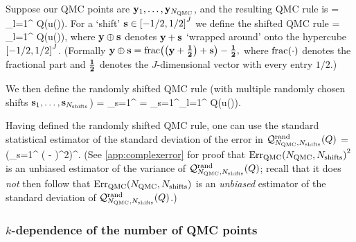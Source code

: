     Suppose our QMC points are $\mathbf{y}_{1},\ldots,\mathbf{y}_{N_{\mathrm{QMC}}}$, and the resulting QMC rule is
    \beqs
{} = \sum_{l=1}^{\NQMC} Q\mleft(u\mleft(\byl\mright)\mright).
\eeqs
For a `shift' $\shift \in \cube{J}$ we define the shifted QMC rule
\beqs
{} = \sum_{l=1}^{\NQMC} Q\mleft(u\mleft(\byl\oplus\shift\mright)\mright),
\eeqs
where $\mathbf{y} \oplus \mathbf{s}$ denotes $\mathbf{y} + \mathbf{s}$ `wrapped around' onto the hypercube $\cube{J}$. (Formally $\by \oplus \shift = \fracoperator{\mleft(\by + \bhalf\mright)+\shift} - \bhalf,$ where $\fracoperator{\cdot}$ denotes the fractional part and $\mathbf{\frac{1}{2}}$ denotes the $J$-dimensional vector with every entry $1/2.$)

We then define the randomly shifted QMC rule (with multiple randomly chosen shifts $\mathbf{s}_{1},\ldots,\mathbf{s}_{N_{\mathrm{shifts}}}$)
\beqs
{} = \sum_{s=1}^{\Nshifts}  = \sum_{s=1}^{\Nshifts}\sum_{l=1}^{\NQMC} Q\mleft(u\mleft(\byl\oplus \shifts\mright)\mright).
\eeqs

Having defined the randomly shifted QMC rule, one can use the standard statistical estimator of the standard deviation of the error in $\QMCrandshift{Q}{\Nshifts}$ \cite[Equation (4.6)]{GrKuNuScSl:11}
\beq\label{eq:errest}
\QMCerror{\NQMC}{\Nshifts} = \mleft(\sum_{s=1}^{\Nshifts} \mleft( - \mright)^2\mright)^{\half}.
\eeq
(See \cref{app:complexerror} for proof that $\QMCerror{\NQMC}{\Nshifts}^2$ is an unbiased estimator of the variance of $\QMCrandshift{Q}{\Nshifts}$; recall that it does \emph{not} then follow that $\QMCerror{\NQMC}{\Nshifts}$ is an \emph{unbiased} estimator of the standard deviation of $\QMCrandshift{Q}{\Nshifts}$.)

\subsubsection{$k$-dependence of the number of QMC points}

